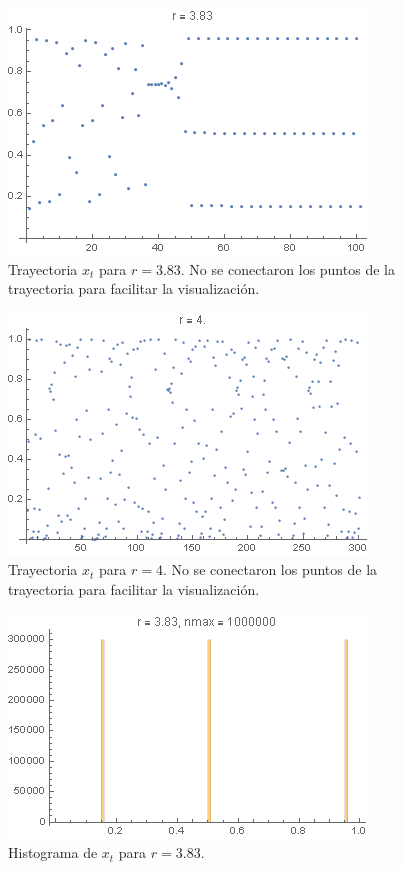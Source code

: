 \documentclass[aps,prb,twocolumn,superscriptaddress,floatfix,longbibliography]{revtex4-2}
\newcounter{para}
\begin{document}
\begin{figure}[htp]
    \includegraphics[clip=true,width=0.7\columnwidth]{a.r_3.83.png}
    \caption{Trayectoria $x_t$ para $r = 3.83$. No se conectaron los puntos de la trayectoria para facilitar la visualización.}
     \label{fig:a.r_3.83}
\end{figure}

\begin{figure}[htp]
    \includegraphics[clip=true,width=0.7\columnwidth]{a.r_4.png}
    \caption{Trayectoria $x_t$ para $r = 4$. No se conectaron los puntos de la trayectoria para facilitar la visualización.}
     \label{fig:a.r_4}
\end{figure}

\begin{figure}[htp]
    \includegraphics[clip=true,width=0.7\columnwidth]{a.histograma_3.83.png}
    \caption{Histograma de $x_t$ para $r = 3.83$.}
     \label{fig:a.histograma_3.83}
\end{figure}
\end{document}
